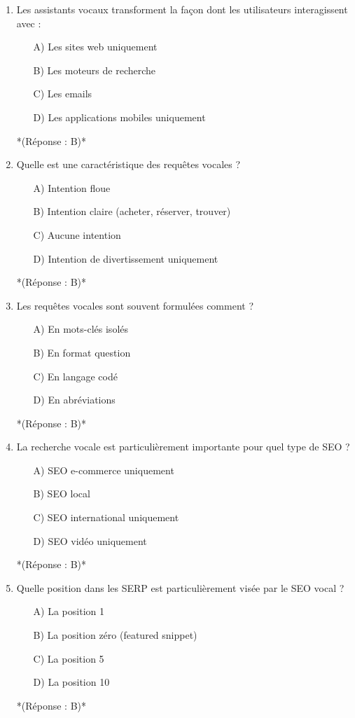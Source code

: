 \documentclass[12pt,a4paper,twoside]{report}
\begin{document}
\begin{enumerate}
    \item Les assistants vocaux transforment la façon dont les utilisateurs interagissent avec :
    \begin{itemize}
        \item[A)] Les sites web uniquement
        \item[B)] Les moteurs de recherche
        \item[C)] Les emails
        \item[D)] Les applications mobiles uniquement
    \end{itemize}
    *(Réponse : B)*

    \item Quelle est une caractéristique des requêtes vocales ?
    \begin{itemize}
        \item[A)] Intention floue
        \item[B)] Intention claire (acheter, réserver, trouver)
        \item[C)] Aucune intention
        \item[D)] Intention de divertissement uniquement
    \end{itemize}
    *(Réponse : B)*

    \item Les requêtes vocales sont souvent formulées comment ?
    \begin{itemize}
        \item[A)] En mots-clés isolés
        \item[B)] En format question
        \item[C)] En langage codé
        \item[D)] En abréviations
    \end{itemize}
    *(Réponse : B)*

    \item La recherche vocale est particulièrement importante pour quel type de SEO ?
    \begin{itemize}
        \item[A)] SEO e-commerce uniquement
        \item[B)] SEO local
        \item[C)] SEO international uniquement
        \item[D)] SEO vidéo uniquement
    \end{itemize}
    *(Réponse : B)*

    \item Quelle position dans les SERP est particulièrement visée par le SEO vocal ?
    \begin{itemize}
        \item[A)] La position 1
        \item[B)] La position zéro (featured snippet)
        \item[C)] La position 5
        \item[D)] La position 10
    \end{itemize}
    *(Réponse : B)*


\end{enumerate}
\end{document}
